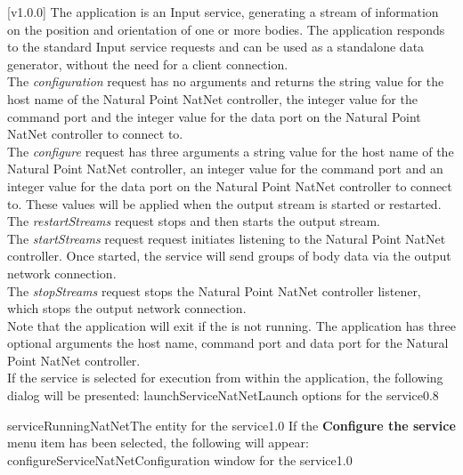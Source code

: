 [v1.0.0]
The  application is an Input service,
generating a stream of information on the position and orientation of one or more bodies.
The application responds to the standard Input service requests and can be used as a
standalone data generator, without the need for a client connection.\\

The \emph{configuration} request has no arguments and returns the string value for the
host name of the Natural Point NatNet controller, the integer value for the command port
and the integer value for the data port on the Natural Point NatNet controller to connect
to.\\

The \emph{configure} request has three arguments \longDash{} a string value for the host
name of the Natural Point NatNet controller, an integer value for the command port and an
integer value for the data port on the Natural Point NatNet controller to connect to.
These values will be applied when the output stream is started or restarted.\\ 

The \emph{restartStreams} request stops and then starts the output stream.\\

The \emph{startStreams} request request initiates listening to the Natural Point NatNet
controller.
Once started, the service will send groups of body data via the output \yarp{} network
connection.\\

The \emph{stopStreams} request stops the Natural Point NatNet controller listener, which
stops the output \yarp{} network connection.\\ 

Note that the application will exit if the \emph{\RS} is not running.
The application has three optional arguments \longDash{} the host name, command port and
data port for the Natural Point NatNet controller.
\insertAppParameters
\insertTagDescription{\NNI}
\insertInputServiceComment\\

\insertStandardServiceCommands
\secondaryEnd
\condPage
{}
If the service is selected for execution from within the \emph{\MMMU} application, the
following dialog will be presented:
%
{launchServiceNatNet}{Launch options for the \emph{\NNI} service}{0.8}

%
{serviceRunningNatNet}{The \emph{\MMMU} entity for the \emph{\NNI} service}{1.0}
\condPage{}
If the \textbf{Configure the service} menu item has been selected, the following will
appear:
%
{configureServiceNatNet}{Configuration window for the \emph{\NNI} service}{1.0}
\secondaryEnd
\primaryEnd{}
